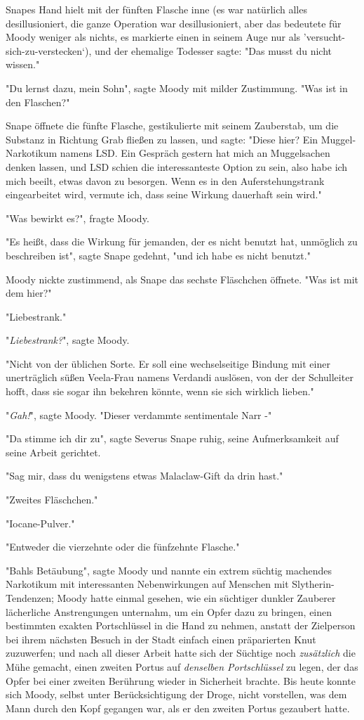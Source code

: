 {Snapes Hand hielt mit der fünften Flasche inne (es war natürlich alles desillusioniert, die ganze Operation war desillusioniert, aber das bedeutete für Moody weniger als nichts, es markierte einen in seinem Auge nur als 'versucht-sich-zu-verstecken`), und der ehemalige Todesser sagte: "Das musst du nicht wissen."

"Du lernst dazu, mein Sohn", sagte Moody mit milder Zustimmung. "Was ist in den Flaschen?"

Snape öffnete die fünfte Flasche, gestikulierte mit seinem Zauberstab, um die Substanz in Richtung Grab fließen zu lassen, und sagte: "Diese hier? Ein Muggel-Narkotikum namens LSD. Ein Gespräch gestern hat mich an Muggelsachen denken lassen, und LSD schien die interessanteste Option zu sein, also habe ich mich beeilt, etwas davon zu besorgen. Wenn es in den Auferstehungstrank eingearbeitet wird, vermute ich, dass seine Wirkung dauerhaft sein wird."

"Was bewirkt es?", fragte Moody.

"Es heißt, dass die Wirkung für jemanden, der es nicht benutzt hat, unmöglich zu beschreiben ist", sagte Snape gedehnt, "und ich habe es nicht benutzt."

Moody nickte zustimmend, als Snape das sechste Fläschchen öffnete. "Was ist mit dem hier?"

"Liebestrank."

"\emph{Liebestrank?}", sagte Moody.

"Nicht von der üblichen Sorte. Er soll eine wechselseitige Bindung mit einer unerträglich süßen Veela-Frau namens Verdandi auslösen, von der der Schulleiter hofft, dass sie sogar ihn bekehren könnte, wenn sie sich wirklich lieben."

"\emph{Gah!}", sagte Moody. "Dieser verdammte sentimentale Narr -"

"Da stimme ich dir zu", sagte Severus Snape ruhig, seine Aufmerksamkeit auf seine Arbeit gerichtet.

"Sag mir, dass du wenigstens etwas Malaclaw-Gift da drin hast."

"Zweites Fläschchen."

"Iocane-Pulver."

"Entweder die vierzehnte oder die fünfzehnte Flasche."

"Bahls Betäubung", sagte Moody und nannte ein extrem süchtig machendes Narkotikum mit interessanten Nebenwirkungen auf Menschen mit Slytherin-Tendenzen; Moody hatte einmal gesehen, wie ein süchtiger dunkler Zauberer lächerliche Anstrengungen unternahm, um ein Opfer dazu zu bringen, einen bestimmten exakten Portschlüssel in die Hand zu nehmen, anstatt der Zielperson bei ihrem nächsten Besuch in der Stadt einfach einen präparierten Knut zuzuwerfen; und nach all dieser Arbeit hatte sich der Süchtige noch \emph{zusätzlich} die Mühe gemacht, einen zweiten Portus auf \emph{denselben Portschlüssel} zu legen, der das Opfer bei einer zweiten Berührung wieder in Sicherheit brachte. Bis heute konnte sich Moody, selbst unter Berücksichtigung der Droge, nicht vorstellen, was dem Mann durch den Kopf gegangen war, als er den zweiten Portus gezaubert hatte.

}
